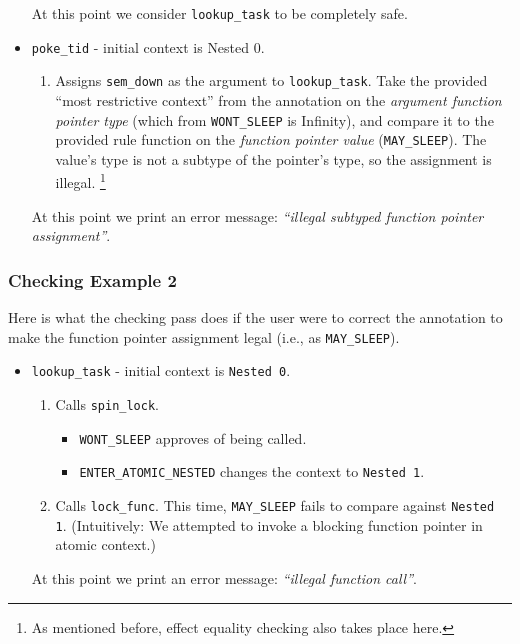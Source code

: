 \documentclass{article}
\begin{document}
\begin{itemize}
\begin{enumerate}
	\end{enumerate}
	At this point we consider \texttt{lookup\_task} to be completely safe.
	\item \texttt{poke\_tid} - initial context is \textsf{Nested $0$}.
	\begin{enumerate}
		\item Assigns \texttt{sem\_down} as the argument to \texttt{lookup\_task}. Take the provided ``most restrictive context'' from the annotation on the {\em argument function pointer type} (which from \texttt{WONT\_SLEEP} is \textsf{Infinity}), and compare it to the provided rule function on the {\em function pointer value} (\texttt{MAY\_SLEEP}). The value's type is not a subtype of the pointer's type, so the assignment is illegal.
			\footnote{As mentioned before, effect equality checking also takes place here.}
	\end{enumerate}	
	At this point we print an error message: {\em ``illegal subtyped function pointer assignment''}.
\end{itemize}

\subsubsection{Checking Example 2}

Here is what the checking pass does if the user were to correct the annotation to make the function pointer assignment legal (i.e., as \texttt{MAY\_SLEEP}).

\begin{itemize}
	\item \texttt{lookup\_task} - initial context is \texttt{Nested 0}.
	\begin{enumerate}
		\item Calls \texttt{spin\_lock}.
			\begin{itemize}
				\item \texttt{WONT\_SLEEP} approves of being called.
				\item \texttt{ENTER\_ATOMIC\_NESTED} changes the context to \texttt{Nested 1}.
			\end{itemize}
		\item Calls \texttt{lock\_func}. This time, \texttt{MAY\_SLEEP} fails to compare against \texttt{Nested 1}. (Intuitively: We attempted to invoke a blocking function pointer in atomic context.)
	\end{enumerate}
	At this point we print an error message: {\em ``illegal function call''}.
\end{itemize}
\end{document}
